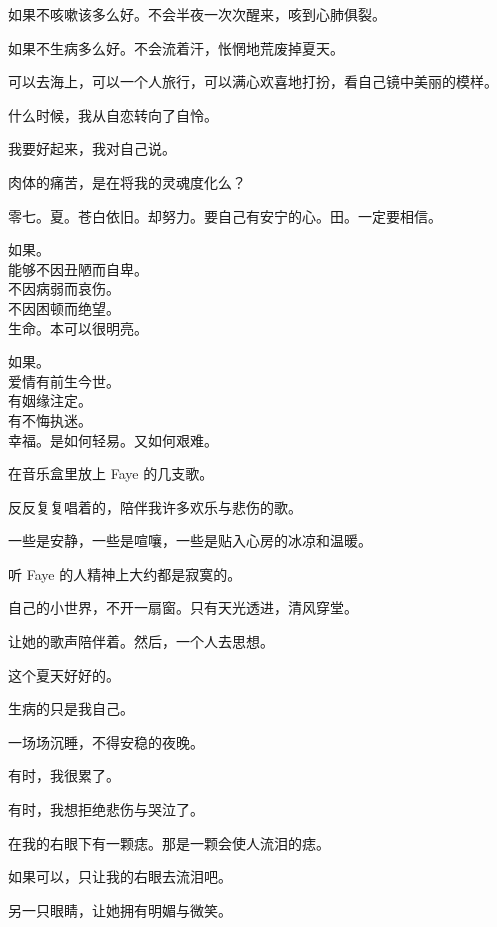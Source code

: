 \documentclass[12pt,a4paper]{article}
\def\blankrev{\vspace{1ex}}									%
\begin{document}
	\endwriting



		如果不咳嗽该多么好。不会半夜一次次醒来，咳到心肺俱裂。\par
		如果不生病多么好。不会流着汗，怅惘地荒废掉夏天。\par
		可以去海上，可以一个人旅行，可以满心欢喜地打扮，看自己镜中美丽的模样。\par
		什么时候，我从自恋转向了自怜。\par
		我要好起来，我对自己说。\par
		肉体的痛苦，是在将我的灵魂度化么？

	\endwriting



		零七。夏。苍白依旧。却努力。要自己有安宁的心。田。一定要相信。

		\longpoem{}{}{}
		如果。\\
		能够不因丑陋而自卑。\\
		不因病弱而哀伤。\\
		不因困顿而绝望。\\
		生命。本可以很明亮。

		如果。\\
		爱情有前生今世。\\
		有姻缘注定。\\
		有不悔执迷。\\
		幸福。是如何轻易。又如何艰难。
		\endlongpoem

	\endwriting



		在音乐盒里放上 Faye 的几支歌。\par
		反反复复唱着的，陪伴我许多欢乐与悲伤的歌。\par
		一些是安静，一些是喧嚷，一些是贴入心房的冰凉和温暖。\par
		听 Faye 的人精神上大约都是寂寞的。\par
		自己的小世界，不开一扇窗。只有天光透进，清风穿堂。\par
		让她的歌声陪伴着。然后，一个人去思想。

		\blankrev
		这个夏天好好的。\par
		生病的只是我自己。\par
		一场场沉睡，不得安稳的夜晚。\par
		有时，我很累了。\par
		有时，我想拒绝悲伤与哭泣了。

		\blankrev
		在我的右眼下有一颗痣。那是一颗会使人流泪的痣。\par
		如果可以，只让我的右眼去流泪吧。\par
		另一只眼睛，让她拥有明媚与微笑。
\end{document}
